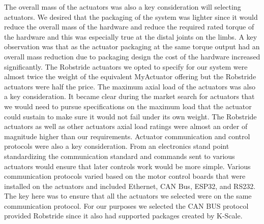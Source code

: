 \documentclass{article}
\begin{document}
The overall mass of the actuators was also a key consideration will selecting actuators. We desired that the packaging of the system was lighter since it would reduce the overall mass of the hardware and reduce the required rated torque of the hardware and this was especially true at the distal joints on the limbs. A key observation was that as the actuator packaging at the same torque output had an overall mass reduction due to packaging design the cost of the hardware increased significantly. The Robstride actuators we opted to specify for our system were almost twice the weight of the equivalent MyActuator offering but the Robstride actuators were half the price. The maximum axial load of the actuators was also a key consideration. It became clear during the market search for actuators that we would need to pursue specifications on the maximum load that the actuator could sustain to make sure it would not fail under its own weight. The Robstride actuators as well as other actuators axial load ratings were almost an order of magnitude higher than our requirements. Actuator communication and control protocols were also a key consideration. From an electronics stand point standardizing the communication standard and commands sent to various actuators would ensure that later controls work would be more simple. Various communication protocols varied based on the motor control boards that were installed on the actuators and included Ethernet, CAN Bus, ESP32, and RS232. The key here was to ensure that all the actuators we selected were on the same communication protocol. For our purposes we selected the CAN BUS protocol provided Robstride since it also had supported packages created by K-Scale. 
\end{document}
